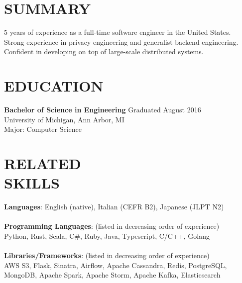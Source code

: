 \documentclass[line,margin]{res}
\begin{document}

\color{HeaderColor}
\address{\hfill me@riizade.com -- riizade@gmail.com}
\address{\hfill linkedin.com/in/riizade -- github.com/riizade -- 1-248-716-5054}


 \renewcommand{\labelitemi}{$-$}

\begin{resume}
\color{black}
\section{\textcolor{HeaderColor}{SUMMARY}}
                5 years of experience as a full-time software engineer in the United States. \\
				Strong experience in privacy engineering and generalist backend engineering. \\
                Confident in developing on top of large-scale distributed systems. \\

\section{\textcolor{HeaderColor}{EDUCATION}} {\sc \textbf{Bachelor of Science in Engineering}} \hfill Graduated August 2016\\
				University of Michigan, Ann Arbor, MI \\
                Major: Computer Science

\section{\textcolor{HeaderColor}{RELATED \\ SKILLS}}
                {\sc \textbf{Languages}: English (native), Italian (CEFR B2), Japanese (JLPT N2)} \\
                \\
				{\sc \textbf{Programming Languages}: (listed in decreasing order of experience)} \\
				Python, Rust, Scala, C\#, Ruby, Java, Typescript, C/C++, Golang\\
                \\
				{\sc \textbf{Libraries/Frameworks}: (listed in decreasing order of experience)} \\
				AWS S3, Flask, Sinatra, Airflow, Apache Cassandra, Redis, PostgreSQL, MongoDB, Apache Spark, Apache Storm, Apache Kafka, Elasticsearch


\end{resume}
\end{document}
